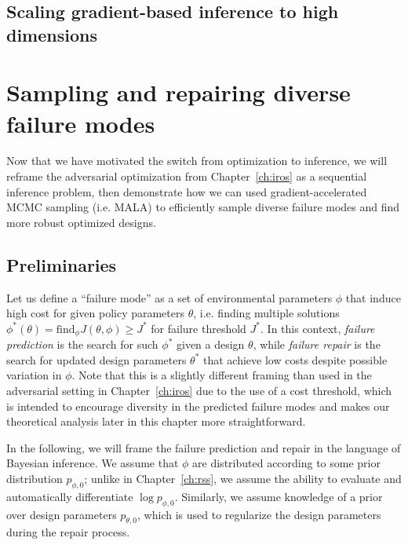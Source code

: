 \subsection{Scaling gradient-based inference to high dimensions}


\section{Sampling and repairing diverse failure modes}


Now that we have motivated the switch from optimization to inference, we will reframe the adversarial optimization from Chapter~\ref{ch:iros} as a sequential inference problem, then demonstrate how we can used gradient-accelerated MCMC sampling (i.e. MALA) to efficiently sample diverse failure modes and find more robust optimized designs.

\subsection{Preliminaries}

Let us define a ``failure mode'' as a set of environmental parameters $\phi$ that induce high cost for given policy parameters $\theta$, i.e. finding multiple solutions $\phi^*(\theta) = \text{find}_\phi J(\theta, \phi) \geq J^*$ for failure threshold $J^*$. In this context, \textit{failure prediction} is the search for such $\phi^*$ given a design $\theta$, while \textit{failure repair} is the search for updated design parameters $\theta^*$ that achieve low costs despite possible variation in $\phi$. Note that this is a slightly different framing than used in the adversarial setting in Chapter~\ref{ch:iros} due to the use of a cost threshold, which is intended to encourage diversity in the predicted failure modes and makes our theoretical analysis later in this chapter more straightforward.

In the following, we will frame the failure prediction and repair in the language of Bayesian inference. We assume that $\phi$ are distributed according to some prior distribution $p_{\phi, 0}$; unlike in Chapter~\ref{ch:rss}, we assume the ability to evaluate and automatically differentiate $\log p_{\phi, 0}$. Similarly, we assume knowledge of a prior over design parameters $p_{\theta, 0}$, which is used to regularize the design parameters during the repair process.

